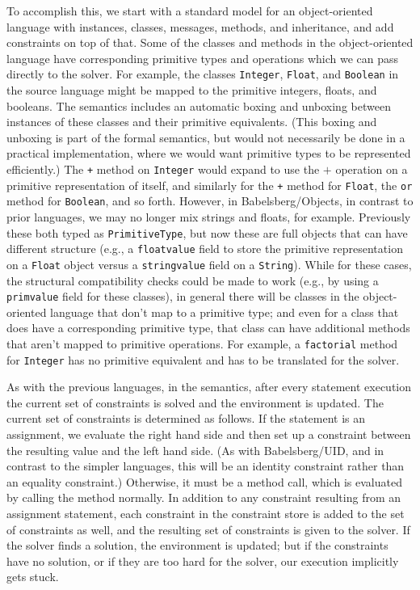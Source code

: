 \documentclass{article}
\begin{document}
To accomplish this, we start with a standard model for an
object-oriented language with instances, classes, messages, methods,
and inheritance, and add constraints on top of that.  Some of the
classes and methods in the object-oriented language have corresponding
primitive types and operations which we can pass directly to the
solver. For example, the classes \verb|Integer|, \verb|Float|, and
\verb|Boolean| in the source language might be mapped to the primitive
integers, floats, and booleans. The semantics includes an automatic
boxing and unboxing between instances of these classes and their
primitive equivalents.  (This boxing and unboxing is part of the
formal semantics, but would not necessarily be done in a practical
implementation, where we would want primitive types to be represented
efficiently.)  The \verb|+| method on \verb|Integer| would expand to
use the $+$ operation on a primitive representation of itself, and
similarly for the \verb|+| method for \verb|Float|, the \verb|or|
method for \verb|Boolean|, and so forth. However, in
Babelsberg/Objects, in contrast to prior languages, we may no longer
mix strings and floats, for example. Previously these both typed as
\verb|PrimitiveType|, but now these are full objects that can have
different structure (e.g., a \verb|floatvalue| field to store the
primitive representation on a \verb|Float| object versus a
\verb|stringvalue| field on a \verb|String|). While for these cases,
the structural compatibility checks could be made to work (e.g., by
using a \verb|primvalue| field for these classes), in general there
will be classes in the object-oriented language that don't map to a
primitive type; and even for a class that does have a corresponding
primitive type, that class can have additional methods that aren't
mapped to primitive operations. For example, a \verb|factorial| method
for \verb|Integer| has no primitive equivalent and has to be
translated for the solver.

As with the previous languages, in the semantics, after every
statement execution the current set of constraints is solved and the
environment is updated.  The current set of constraints is determined
as follows.  If the statement is an assignment, we evaluate the right
hand side and then set up a constraint between the resulting value and
the left hand side.  (As with Babelsberg/UID, and in contrast to the
simpler languages, this will be an identity constraint rather than an
equality constraint.)  Otherwise, it must be a method call, which is
evaluated by calling the method normally.
In addition to any constraint resulting from an
assignment statement, each constraint in the constraint store is added
to the set of constraints as well, and the resulting set of
constraints is given to the solver.  If the solver finds a solution,
the environment is updated; but if the constraints have no solution,
or if they are too hard for the solver, our execution implicitly gets stuck.
\end{document}
